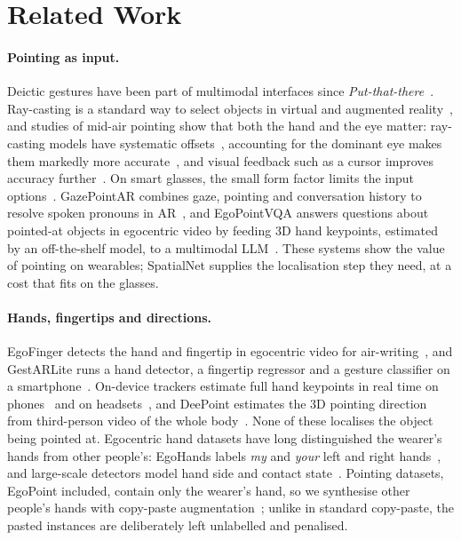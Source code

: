 \section{Related Work}\label{sec:related}

\paragraph{Pointing as input.} Deictic gestures have been part of multimodal interfaces since \emph{Put-that-there}~\cite{bolt1980put}. Ray-casting is a standard way to select objects in virtual and augmented reality~\cite{argelaguet2013survey}, and studies of mid-air pointing show that both the hand and the eye matter: ray-casting models have systematic offsets~\cite{mayer2015modeling}, accounting for the dominant eye makes them markedly more accurate~\cite{plaumann2018towards}, and visual feedback such as a cursor improves accuracy further~\cite{mayer2018effect}. On smart glasses, the small form factor limits the input options~\cite{lee2018interaction}. GazePointAR combines gaze, pointing and conversation history to resolve spoken pronouns in AR~\cite{lee2024gazepointar}, and EgoPointVQA answers questions about pointed-at objects in egocentric video by feeding 3D hand keypoints, estimated by an off-the-shelf model, to a multimodal LLM~\cite{choi2026hint}. These systems show the value of pointing on wearables; SpatialNet supplies the localisation step they need, at a cost that fits on the glasses.

\paragraph{Hands, fingertips and directions.} EgoFinger detects the hand and fingertip in egocentric video for air-writing~\cite{huang2016pointing}, and GestARLite runs a hand detector, a fingertip regressor and a gesture classifier on a smartphone~\cite{jain2019gestarlite}. On-device trackers estimate full hand keypoints in real time on phones~\cite{zhang2020mediapipe} and on headsets~\cite{han2020megatrack}, and DeePoint estimates the 3D pointing direction from third-person video of the whole body~\cite{nakamura2023deepoint}. None of these localises the object being pointed at. Egocentric hand datasets have long distinguished the wearer's hands from other people's: EgoHands labels \emph{my} and \emph{your} left and right hands~\cite{bambach2015lending}, and large-scale detectors model hand side and contact state~\cite{shan2020understanding}. Pointing datasets, EgoPoint included, contain only the wearer's hand, so we synthesise other people's hands with copy-paste augmentation~\cite{dwibedi2017cut,ghiasi2021simple}; unlike in standard copy-paste, the pasted instances are deliberately left unlabelled and penalised.

